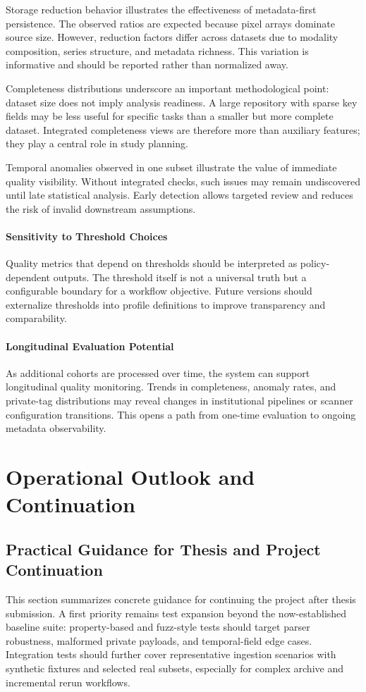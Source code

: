 Storage reduction behavior illustrates the effectiveness of metadata-first persistence. The observed ratios are expected because pixel arrays dominate source size. However, reduction factors differ across datasets due to modality composition, series structure, and metadata richness. This variation is informative and should be reported rather than normalized away.

Completeness distributions underscore an important methodological point: dataset size does not imply analysis readiness. A large repository with sparse key fields may be less useful for specific tasks than a smaller but more complete dataset. Integrated completeness views are therefore more than auxiliary features; they play a central role in study planning.

Temporal anomalies observed in one subset illustrate the value of immediate quality visibility. Without integrated checks, such issues may remain undiscovered until late statistical analysis. Early detection allows targeted review and reduces the risk of invalid downstream assumptions.

\paragraph{Sensitivity to Threshold Choices}
Quality metrics that depend on thresholds should be interpreted as policy-dependent outputs. The threshold itself is not a universal truth but a configurable boundary for a workflow objective. Future versions should externalize thresholds into profile definitions to improve transparency and comparability.

\paragraph{Longitudinal Evaluation Potential}
As additional cohorts are processed over time, the system can support longitudinal quality monitoring. Trends in completeness, anomaly rates, and private-tag distributions may reveal changes in institutional pipelines or scanner configuration transitions. This opens a path from one-time evaluation to ongoing metadata observability.

\section{Operational Outlook and Continuation}
\subsection{Practical Guidance for Thesis and Project Continuation}
This section summarizes concrete guidance for continuing the project after thesis submission. A first priority remains test expansion beyond the now-established baseline suite: property-based and fuzz-style tests should target parser robustness, malformed private payloads, and temporal-field edge cases. Integration tests should further cover representative ingestion scenarios with synthetic fixtures and selected real subsets, especially for complex archive and incremental rerun workflows.

